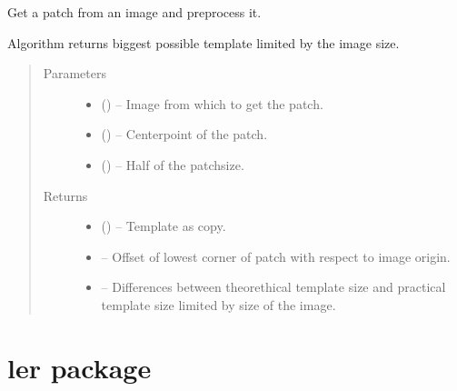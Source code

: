 \documentclass[letterpaper,10pt,english]{sphinxmanual}
\begin{document}
\begin{fulllineitems}
\label{\detokenize{image_sac:image_sac.get_and_pre_patch}}
Get a patch from an image and preprocess it.

Algorithm returns biggest possible template limited by the image size.
\begin{quote}\begin{description}
\item[{Parameters}] \leavevmode\begin{itemize}
\item {} 
 () -- Image from which to get the patch.

\item {} 
 () -- Centerpoint of the patch.

\item {} 
 () -- Half of the patchsize.

\end{itemize}

\item[{Returns}] \leavevmode
\begin{itemize}
\item {} 
 () -- Template as copy.

\item {} 
 -- Offset of lowest corner of patch with respect to image origin.

\item {} 
 -- Differences between theorethical template size and practical
template size limited by size of the image.

\end{itemize}


\end{description}\end{quote}

\end{fulllineitems}



\chapter{ler package}
\label{\detokenize{ler::doc}}\label{\detokenize{ler:ler-package}}
\end{document}
